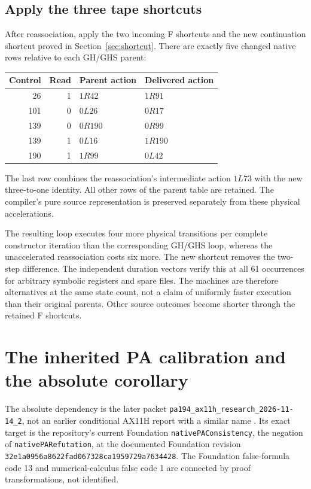 \documentclass[11pt,letterpaper]{article}
\newcommand{\file}[1]{\nolinkurl{#1}}
\begin{document}
\subsection{Apply the three tape shortcuts}
After reassociation, apply the two incoming F shortcuts and the new
continuation shortcut proved in Section~\ref{sec:shortcut}. There are
exactly five changed native rows relative to each GH/GHS parent:
\begin{center}
\begin{tabular}{rrll}
\toprule
Control & Read & Parent action & Delivered action\\
\midrule
26 & 1 & $1R42$ & $1R91$\\
101 & 0 & $0L26$ & $0R17$\\
139 & 0 & $0R190$ & $0R99$\\
139 & 1 & $0L16$ & $1R190$\\
190 & 1 & $1R99$ & $0L42$\\
\bottomrule
\end{tabular}
\end{center}
The last row combines the reassociation's intermediate action $1L73$
with the new three-to-one identity. All other rows of the parent table
are retained. The compiler's pure source representation is preserved
separately from these physical accelerations.

The resulting loop executes four more physical transitions per complete
constructor iteration than the corresponding GH/GHS loop, whereas the
unaccelerated reassociation costs six more. The new shortcut removes the
two-step difference. The independent duration vectors verify this at all
61 occurrences for arbitrary symbolic registers and spare files. The
machines are therefore alternatives at the same state count, not a claim
of uniformly faster execution than their original parents. Other source
outcomes become shorter through the retained F shortcuts.



\section{The inherited PA calibration and the absolute corollary}
\label{sec:calibration}
The absolute dependency is the later packet
\file{pa194_ax11h_research_2026-11-14_2}, not an earlier conditional AX11H
report with a similar name \cite{ax11h,incoming}. Its exact target is the repository's current
Foundation \file{nativePAConsistency}, the negation of
\file{nativePARefutation}, at the documented Foundation revision
\nolinkurl{32e1a0956a8622fad067328ca1959729a7634428}.
The Foundation false-formula code 13 and numerical-calculus false code 1
are connected by proof transformations, not identified.
\end{document}
